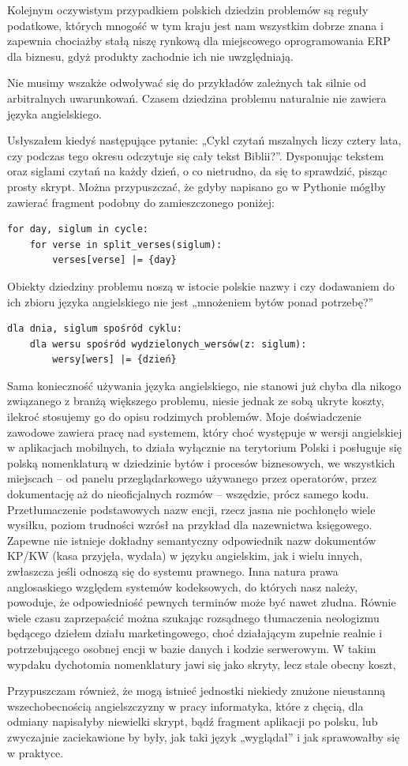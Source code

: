 Kolejnym oczywistym przypadkiem polskich dziedzin problemów są reguły podatkowe, których mnogość w tym kraju jest nam wszystkim dobrze znana i zapewnia chociażby stałą niszę rynkową dla miejscowego oprogramowania ERP dla biznesu, gdyż produkty zachodnie ich nie uwzględniają.

Nie musimy wszakże odwoływać się do przykładów zależnych tak silnie od arbitralnych uwarunkowań. Czasem dziedzina problemu naturalnie nie zawiera języka angielskiego. 

Usłyszałem kiedyś następujące pytanie: „Cykl czytań mszalnych liczy cztery lata, czy podczas tego okresu odczytuje się cały tekst Biblii?”. Dysponując tekstem oraz siglami czytań na każdy dzień, o co nietrudno, da się to sprawdzić, pisząc prosty skrypt. Można przypuszczać, że gdyby napisano go w Pythonie mógłby zawierać fragment podobny do zamieszczonego poniżej:
\begin{lstlisting}
for day, siglum in cycle:
	for verse in split_verses(siglum):
		verses[verse] |= {day}    
\end{lstlisting}

Obiekty dziedziny problemu noszą w istocie polskie nazwy i czy dodawaniem do ich zbioru języka angielskiego nie jest „mnożeniem bytów ponad potrzebę?”
\begin{lstlisting}
dla dnia, siglum spośród cyklu:
	dla wersu spośród wydzielonych_wersów(z: siglum):
		wersy[wers] |= {dzień}
\end{lstlisting}
Sama konieczność używania języka angielskiego, nie stanowi już chyba dla nikogo związanego z branżą większego problemu, niesie jednak ze sobą ukryte koszty, ilekroć stosujemy go do opisu rodzimych problemów. Moje doświadczenie zawodowe zawiera pracę nad systemem, który choć występuje w wersji angielskiej w aplikacjach mobilnych, to działa wyłącznie na terytorium Polski i posługuje się polską nomenklaturą w dziedzinie bytów i procesów biznesowych, we wszystkich miejscach – od panelu przeglądarkowego używanego przez operatorów, przez dokumentację aż do nieoficjalnych rozmów – wszędzie, prócz samego kodu. Przetłumaczenie podstawowych nazw encji, rzecz jasna nie pochłonęło wiele wysiłku, poziom trudności wzrósł na przykład dla nazewnictwa księgowego. Zapewne nie istnieje dokładny semantyczny odpowiednik nazw dokumentów KP/KW (kasa przyjęła, wydała) w języku angielskim, jak i wielu innych, zwłaszcza jeśli odnoszą się do systemu prawnego. Inna natura prawa anglosaskiego względem systemów kodeksowych, do których nasz należy, powoduje, że odpowiedniość pewnych terminów może być nawet złudna. Równie wiele czasu zaprzepaścić można szukając rozsądnego tłumaczenia neologizmu będącego dziełem działu marketingowego, choć działającym zupełnie realnie i potrzebującego osobnej encji w bazie danych i kodzie serwerowym. W takim wypdaku dychotomia nomenklatury jawi się jako skryty, lecz stale obecny koszt, 

Przypuszczam również, że mogą istnieć jednostki niekiedy znużone nieustanną wszechobecnością angielszczyzny w pracy informatyka, które z chęcią, dla odmiany napisałyby niewielki skrypt, bądź fragment aplikacji po polsku, lub zwyczajnie zaciekawione by były, jak taki język „wyglądał” i jak sprawowałby się w praktyce.

